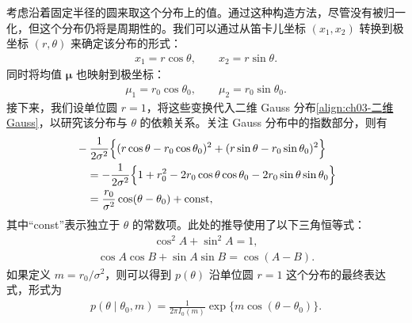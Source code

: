 \documentclass[../../main.tex]{subfiles}
\begin{document}
考虑沿着固定半径的圆来取这个分布上的值。通过这种构造方法，尽管没有被归一化，但这个分布仍将是周期性的。我们可以通过从笛卡儿坐标 $(x_1,x_2)$ 转换到极坐标 $(r,\theta)$ 来确定该分布的形式：
\begin{align}
x_1=r\cos\theta,\qquad x_2=r\sin\theta.
\label{align:ch03-极坐标}
\end{align}
同时将均值 $\boldsymbol{\mu}$ 也映射到极坐标：
\begin{align}
\mu_1=r_0\cos\theta_0,\qquad \mu_2=r_0\sin\theta_0.
\label{align:ch03-极坐标均值}
\end{align}
接下来，我们设单位圆 $r=1$，将这些变换代入二维 Gauss 分布\eqref{align:ch03-二维Gauss}，以研究该分布与 $\theta$ 的依赖关系。关注 Gauss 分布中的指数部分，则有
\begin{align}
&-\frac{1}{2\sigma^{2}}\Bigl\{(r\cos\theta-r_0\cos\theta_0)^{2}+(r\sin\theta-r_0\sin\theta_0)^{2}\Bigr\}\nonumber\\
&\quad=-\frac{1}{2\sigma^{2}}\Bigl\{1+r_0^{2}-2r_0\cos\theta\cos\theta_0-2r_0\sin\theta\sin\theta_0\Bigr\}\nonumber\\
&\quad=\frac{r_0}{\sigma^{2}}\cos(\theta-\theta_0)+\text{const},
\label{align:ch03-指数极坐标}
\end{align}
其中“const”表示独立于 $\theta$ 的常数项。此处的推导使用了以下三角恒等式：
\begin{align}
\cos^{2}A+\sin^{2}A=1,
\label{align:ch03-三角恒等式1}
\end{align}
\begin{align}
\cos A\cos B+\sin A\sin B=\cos(A-B).
\label{align:ch03-三角恒等式2}
\end{align}
如果定义 $m=r_0/\sigma^{2}$，则可以得到 $p(\theta)$ 沿单位圆 $r=1$ 这个分布的最终表达式，形式为
\begin{align}
p(\theta\mid\theta_0,m)=\frac{1}{2\pi I_0(m)}\exp\bigl\{m\cos(\theta-\theta_0)\bigr\}.
\label{align:ch03-冯米塞斯分布}
\end{align}
\end{document}
